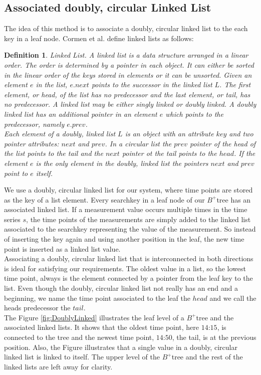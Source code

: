 \documentclass[abstracton,12pt]{scrreprt}
\newtheorem{definition}{Definition}
\begin{document}
\subsection{Associated doubly, circular Linked List}
\label{doublyLinked}
The idea of this method is to associate a doubly, circular linked list to the each key in a leaf node. Cormen et al.\cite{LinkedListBook} define linked lists as follows: 
\begin{definition}
	Linked List. A linked list is a data structure arranged in a linear order. The order is determined by a pointer in each object. It can either be sorted in the linear order of the keys stored in elements or it can be unsorted. Given an element $e$ in the list, $e.next$ points to the successor in the linked list $L$. The first element, or head, of the list has no predecessor and the last element, or tail, has no predecessor. A linked list may be either singly linked or doubly linked. A doubly linked list has an additional pointer in an element $e$ which points to the predecessor, namely $e.prev$.\\
	Each element of a doubly, linked list $L$ is an object with an attribute $key$ and two pointer attributes: $next$ and $prev$. In a circular list the $prev$ pointer of the head of the list points to the tail and the $next$ pointer ot the tail points to the $head$. If the element $e$ is the only element in the doubly, linked list the pointers $next$ and $prev$ point to $e$ itself. 
\end{definition}


We use a doubly, circular linked list for our system, where time points are stored as the key of a list element. Every searchkey in a leaf node of our $B^+$tree has an associated linked list. If a measurement value occurs multiple times in the time series $s$, the time points of the measurements are simply added to the linked list associated to the searchkey representing the value of the measurement. So instead of inserting the key again and using another position in the leaf, the new time point is inserted as a linked list value.\\ 
Associating a doubly, circular linked list that is interconnected in both directions is ideal for satisfying our requirements. The oldest value in a list, so the lowest time point, always is the element connected by a pointer from the leaf key to the list. Even though the doubly, circular linked list not really has an end and a beginning, we name the time point associated to the leaf the $head$ and we call the heads predecessor the $tail$. \\The Figure \ref{fig:DoublyLinked} illustrates the leaf level of a $B^+$tree and the associated linked lists. It shows that the oldest time point, here $\text{14:15}$, is connected to the tree and the newest time point, $\text{14:50}$, the tail, is at the previous position. Also, the Figure illustrates that a single value in a doubly, circular linked list is linked to itself. The upper level of the $B^+$tree and the rest of the linked lists are left away for clarity. 
\end{document}
